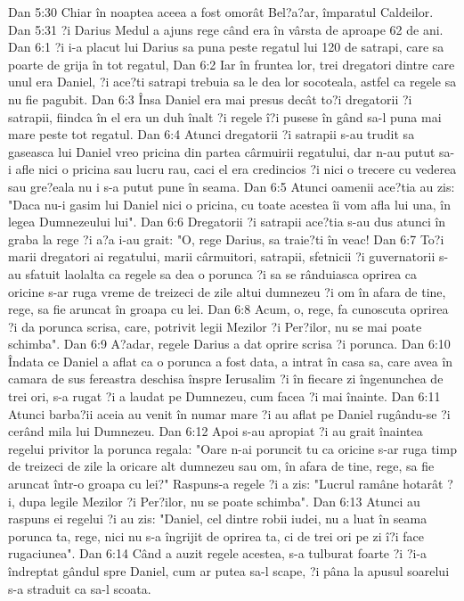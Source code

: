 Dan 5:30  Chiar în noaptea aceea a fost omorât Bel?a?ar, împaratul Caldeilor.
Dan 5:31  ?i Darius Medul a ajuns rege când era în vârsta de aproape 62 de ani.
Dan 6:1  ?i i-a placut lui Darius sa puna peste regatul lui 120 de satrapi, care sa poarte de grija în tot regatul,
Dan 6:2  Iar în fruntea lor, trei dregatori dintre care unul era Daniel, ?i ace?ti satrapi trebuia sa le dea lor socoteala, astfel ca regele sa nu fie pagubit.
Dan 6:3  Însa Daniel era mai presus decât to?i dregatorii ?i satrapii, fiindca în el era un duh înalt ?i regele î?i pusese în gând sa-l puna mai mare peste tot regatul.
Dan 6:4  Atunci dregatorii ?i satrapii s-au trudit sa gaseasca lui Daniel vreo pricina din partea cârmuirii regatului, dar n-au putut sa-i afle nici o pricina sau lucru rau, caci el era credincios ?i nici o trecere cu vederea sau gre?eala nu i s-a putut pune în seama.
Dan 6:5  Atunci oamenii ace?tia au zis: "Daca nu-i gasim lui Daniel nici o pricina, cu toate acestea îi vom afla lui una, în legea Dumnezeului lui".
Dan 6:6  Dregatorii ?i satrapii ace?tia s-au dus atunci în graba la rege ?i a?a i-au grait: "O, rege Darius, sa traie?ti în veac!
Dan 6:7  To?i marii dregatori ai regatului, marii cârmuitori, satrapii, sfetnicii ?i guvernatorii s-au sfatuit laolalta ca regele sa dea o porunca ?i sa se rânduiasca oprirea ca oricine s-ar ruga vreme de treizeci de zile altui dumnezeu ?i om în afara de tine, rege, sa fie aruncat în groapa cu lei.
Dan 6:8  Acum, o, rege, fa cunoscuta oprirea ?i da porunca scrisa, care, potrivit legii Mezilor ?i Per?ilor, nu se mai poate schimba".
Dan 6:9  A?adar, regele Darius a dat oprire scrisa ?i porunca.
Dan 6:10  Îndata ce Daniel a aflat ca o porunca a fost data, a intrat în casa sa, care avea în camara de sus fereastra deschisa înspre Ierusalim ?i în fiecare zi îngenunchea de trei ori, s-a rugat ?i a laudat pe Dumnezeu, cum facea ?i mai înainte.
Dan 6:11  Atunci barba?ii aceia au venit în numar mare ?i au aflat pe Daniel rugându-se ?i cerând mila lui Dumnezeu.
Dan 6:12  Apoi s-au apropiat ?i au grait înaintea regelui privitor la porunca regala: "Oare n-ai poruncit tu ca oricine s-ar ruga timp de treizeci de zile la oricare alt dumnezeu sau om, în afara de tine, rege, sa fie aruncat într-o groapa cu lei?" Raspuns-a regele ?i a zis: "Lucrul ramâne hotarât ?i, dupa legile Mezilor ?i Per?ilor, nu se poate schimba".
Dan 6:13  Atunci au raspuns ei regelui ?i au zis: "Daniel, cel dintre robii iudei, nu a luat în seama porunca ta, rege, nici nu s-a îngrijit de oprirea ta, ci de trei ori pe zi î?i face rugaciunea".
Dan 6:14  Când a auzit regele acestea, s-a tulburat foarte ?i ?i-a îndreptat gândul spre Daniel, cum ar putea sa-l scape, ?i pâna la apusul soarelui s-a straduit ca sa-l scoata.
